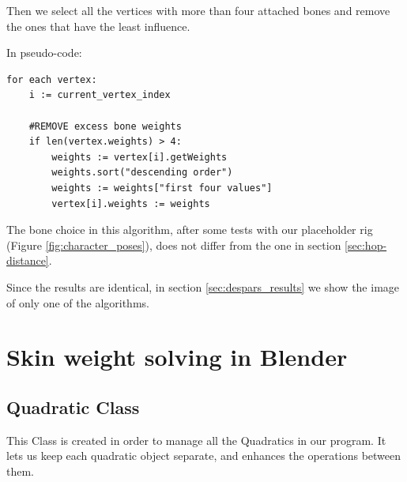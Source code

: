 \documentclass[12pt,twoside]{report}
\begin{document}
Then we select all the vertices with more than four attached bones and remove the ones that have the least influence.

In pseudo-code:

\begin{lstlisting}
for each vertex:
	i := current_vertex_index

	#REMOVE excess bone weights
	if len(vertex.weights) > 4:
		weights := vertex[i].getWeights
		weights.sort("descending order")
		weights := weights["first four values"]
		vertex[i].weights := weights
\end{lstlisting}

The bone choice in this algorithm, after some tests with our placeholder rig (Figure \ref{fig:character_poses}), does not differ from the one in section \ref{sec:hop-distance}.

Since the results are identical, in section \ref{sec:despars_results} we show the image of only one of the algorithms.

\section{Skin weight solving in Blender}
\label{sec:skinSolvingImplem}

\subsection{Quadratic Class}
This Class is created in order to manage all the Quadratics in our program. It lets us keep each quadratic object separate, and enhances the operations between them.
\end{document}

